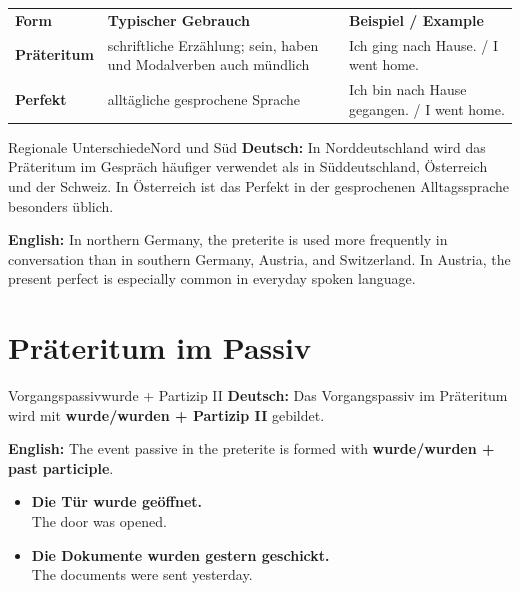 \documentclass[a4paper,11pt]{article}
\newcommand{\GermanText}[1]{\textbf{Deutsch: }#1\par}
\newcommand{\EnglishText}[1]{{\small\color{SoftGray}\textbf{English: }#1\par}}
\newcommand{\ExampleItem}[2]{\item \textbf{#1}\\{\small\color{SoftGray}#2}}
\begin{document}
        \begin{longtable}{>{\bfseries}p{3cm}|p{5cm}|p{5cm}}
            \rowcolor{HeaderBlueDark}
            \color{white}\textbf{Form} &
            \color{white}\textbf{Typischer Gebrauch} &
            \color{white}\textbf{Beispiel / Example} \\
            Präteritum & schriftliche Erzählung; sein, haben und Modalverben auch mündlich & Ich ging nach Hause. / I went home. \\
            Perfekt & alltägliche gesprochene Sprache & Ich bin nach Hause gegangen. / I went home. \\
        \end{longtable}
        
        \begin{grammarentry}{Regionale Unterschiede}{Nord und Süd}
            \GermanText{In Norddeutschland wird das Präteritum im Gespräch häufiger verwendet als in Süddeutschland, Österreich und der Schweiz. In Österreich ist das Perfekt in der gesprochenen Alltagssprache besonders üblich.}
            \EnglishText{In northern Germany, the preterite is used more frequently in conversation than in southern Germany, Austria, and Switzerland. In Austria, the present perfect is especially common in everyday spoken language.}
        \end{grammarentry}
    
    
    \section{Präteritum im Passiv}
        
        \begin{grammarentry}{Vorgangspassiv}{wurde + Partizip II}
            \GermanText{Das Vorgangspassiv im Präteritum wird mit \textbf{wurde/wurden + Partizip II} gebildet.}
            \EnglishText{The event passive in the preterite is formed with \textbf{wurde/wurden + past participle}.}
        \end{grammarentry}
        
        \begin{exbox}
            \begin{itemize}
                \ExampleItem{Die Tür wurde geöffnet.}{The door was opened.}
                \ExampleItem{Die Dokumente wurden gestern geschickt.}{The documents were sent yesterday.}
            \end{itemize}
        \end{exbox}
        
\end{document}
